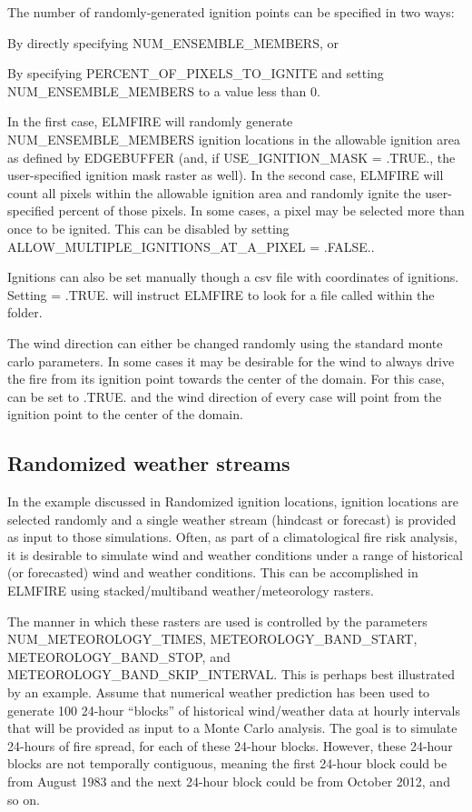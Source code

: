 The number of randomly-generated ignition points can be specified in two ways:

By directly specifying NUM\_ENSEMBLE\_MEMBERS, or

By specifying PERCENT\_OF\_PIXELS\_TO\_IGNITE and setting NUM\_ENSEMBLE\_MEMBERS to a value less than 0.

In the first case, ELMFIRE will randomly generate NUM\_ENSEMBLE\_MEMBERS ignition locations in the allowable ignition area as defined by EDGEBUFFER (and, if USE\_IGNITION\_MASK = .TRUE., the user-specified ignition mask raster as well). In the second case, ELMFIRE will count all pixels within the allowable ignition area and randomly ignite the user-specified percent of those pixels. In some cases, a pixel may be selected more than once to be ignited. This can be disabled by setting ALLOW\_MULTIPLE\_IGNITIONS\_AT\_A\_PIXEL = .FALSE..

Ignitions can also be set manually though a csv file with coordinates of ignitions. Setting  = .TRUE. will instruct ELMFIRE to look for a file called  within the  folder.

The wind direction can either be changed randomly using the standard monte carlo parameters. In some cases it may be desirable for the wind to always drive the fire from its ignition point towards the center of the domain. For this case,  can be set to .TRUE. and the wind direction of every case will point from the ignition point to the center of the domain. 

\subsection{Randomized weather streams}
\label{randomized_weather}

In the example discussed in Randomized ignition locations, ignition locations are selected randomly and a single weather stream (hindcast or forecast) is provided as input to those simulations. Often, as part of a climatological fire risk analysis, it is desirable to simulate wind and weather conditions under a range of historical (or forecasted) wind and weather conditions. This can be accomplished in ELMFIRE using stacked/multiband weather/meteorology rasters.

The manner in which these rasters are used is controlled by the parameters NUM\_METEOROLOGY\_TIMES, METEOROLOGY\_BAND\_START, METEOROLOGY\_BAND\_STOP, and METEOROLOGY\_BAND\_SKIP\_INTERVAL. This is perhaps best illustrated by an example. Assume that numerical weather prediction has been used to generate 100 24-hour “blocks” of historical wind/weather data at hourly intervals that will be provided as input to a Monte Carlo analysis. The goal is to simulate 24-hours of fire spread, for each of these 24-hour blocks. However, these 24-hour blocks are not temporally contiguous, meaning the first 24-hour block could be from August 1983 and the next 24-hour block could be from October 2012, and so on.

